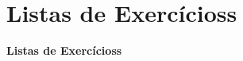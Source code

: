 



\section[Listas de Exercícioss]{Listas de Exercícioss}\label{sec:listas}



{
  \begin{frame}[plain]%

    \vfill

    \centering{}
    \Huge{\textbf{Listas de Exercícioss}}

    \vfill

  \end{frame}
} %



